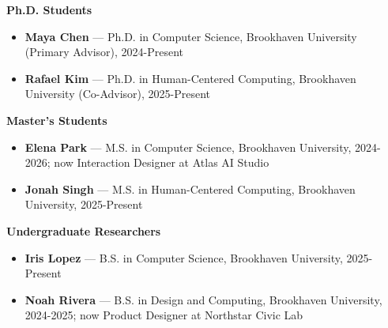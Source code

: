 %
%
%


\textcolor{accentcolor}{\textbf{Ph.D. Students}}

\begin{itemize}
\item \textbf{Maya Chen} --- Ph.D. in Computer Science, Brookhaven University (Primary Advisor), 2024-Present
\item \textbf{Rafael Kim} --- Ph.D. in Human-Centered Computing, Brookhaven University (Co-Advisor), 2025-Present
\end{itemize}


\textcolor{accentcolor}{\textbf{Master's Students}}
\begin{itemize}
\item \textbf{Elena Park} --- M.S. in Computer Science, Brookhaven University, 2024-2026; now Interaction Designer at Atlas AI Studio
\item \textbf{Jonah Singh} --- M.S. in Human-Centered Computing, Brookhaven University, 2025-Present
\end{itemize}


\textcolor{accentcolor}{\textbf{Undergraduate Researchers}}
\begin{itemize}
\item \textbf{Iris Lopez} --- B.S. in Computer Science, Brookhaven University, 2025-Present
\item \textbf{Noah Rivera} --- B.S. in Design and Computing, Brookhaven University, 2024-2025; now Product Designer at Northstar Civic Lab
\end{itemize}
